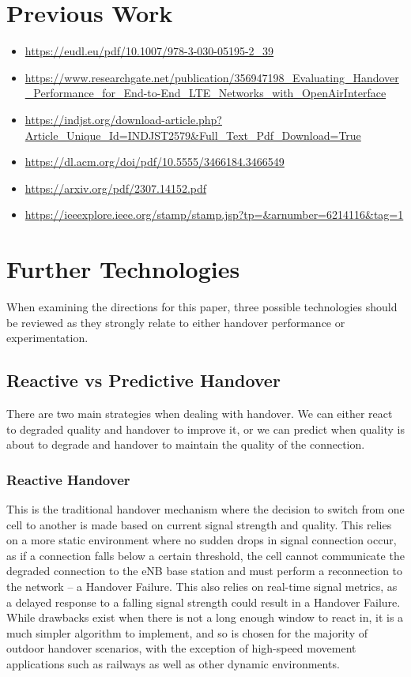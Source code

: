 
\section{Previous Work}
\begin{itemize}
    \item \url{https://eudl.eu/pdf/10.1007/978-3-030-05195-2_39}
    \item \url{https://www.researchgate.net/publication/356947198_Evaluating_Handover_Performance_for_End-to-End_LTE_Networks_with_OpenAirInterface}
    \item \url{https://indjst.org/download-article.php?Article_Unique_Id=INDJST2579&Full_Text_Pdf_Download=True}
    \item \url{https://dl.acm.org/doi/pdf/10.5555/3466184.3466549}
    \item \url{https://arxiv.org/pdf/2307.14152.pdf}
    \item \url{https://ieeexplore.ieee.org/stamp/stamp.jsp?tp=&arnumber=6214116&tag=1}
\end{itemize}

\section{Further Technologies}
When examining the directions for this paper, three possible technologies should be reviewed as they strongly relate to either handover performance or experimentation. 

\subsection{Reactive vs Predictive Handover}
There are two main strategies when dealing with handover. We can either react to degraded quality and handover to improve it, or we can predict when quality is about to degrade and handover to maintain the quality of the connection.

\subsubsection*{Reactive Handover} This is the traditional handover mechanism where the decision to switch from one cell to another is made based on current signal strength and quality. This relies on a more static environment where no sudden drops in signal connection occur, as if a connection falls below a certain threshold, the cell cannot communicate the degraded connection to the eNB base station and must perform a reconnection to the network -- a Handover Failure. This also relies on real-time signal metrics, as a delayed response to a falling signal strength could result in a Handover Failure. While drawbacks exist when there is not a long enough window to react in, it is a much simpler algorithm to implement, and so is chosen for the majority of outdoor handover scenarios, with the exception of high-speed movement applications such as railways \cite{Kosmopoulos2022Handover} as well as other dynamic environments.
                
